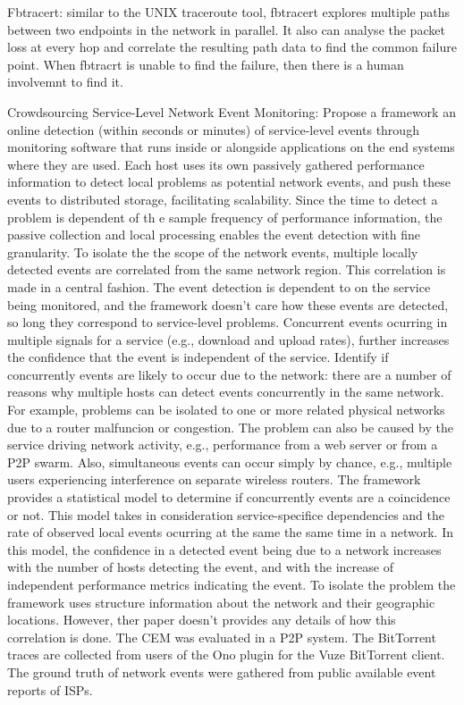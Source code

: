Fbtracert: similar to the UNIX traceroute tool, fbtracert explores multiple
paths between two endpoints in the network in parallel. It also can analyse the
packet loss at every hop and correlate the resulting path data to find the
common failure point. When fbtracrt is unable to find the failure, then there
is a human involvemnt to find it.

Crowdsourcing Service-Level Network Event Monitoring: Propose a framework an
online detection (within seconds or minutes) of service-level events through
monitoring software that runs inside or alongside applications on the end
systems where they are used. Each host uses its own passively gathered
performance information to detect local problems as potential network events,
and push these events to distributed storage,
facilitating scalability. Since the time to detect a problem is dependent of th
e sample frequency of performance information, the passive collection and local
processing enables the event detection with fine granularity. To isolate the
the scope of the network events, multiple locally detected events are
correlated from the same network region. This correlation is made in a central
fashion. The event detection is dependent to on the service being monitored,
and the framework doesn't care how these events are detected, so long they
correspond to service-level problems. Concurrent events ocurring in multiple
signals for a service (e.g., download and upload rates), further increases the
confidence that the event is independent of the service.
Identify if concurrently events are likely to occur due to the network: there
are a number of reasons why multiple hosts can detect events concurrently in
the same network. For example, problems can be isolated to one or more related
physical networks due to a router malfuncion or congestion. The problem can
also be caused by the service driving network activity, e.g., performance from
a web server or from a P2P swarm. Also, simultaneous events can occur simply by
 chance, e.g., multiple users experiencing interference on separate wireless
 routers. The framework provides a statistical model to determine if
 concurrently events are a coincidence or not. This model takes in
 consideration service-specifice dependencies and the rate of observed local
 events ocurring at the same the same time in a network. In this model, the
 confidence in a detected event being due to a network increases with the
 number of hosts detecting the event, and with the increase of independent
 performance metrics indicating the event. To isolate the problem the framework
 uses structure information about the network and their geographic locations.
 However, ther paper doesn't provides any details of how this correlation is
 done.
 The CEM was evaluated in a P2P system. The BitTorrent traces are collected
 from users of the Ono plugin for the Vuze BitTorrent client. The ground truth
 of network events were gathered from public available event reports of ISPs.

